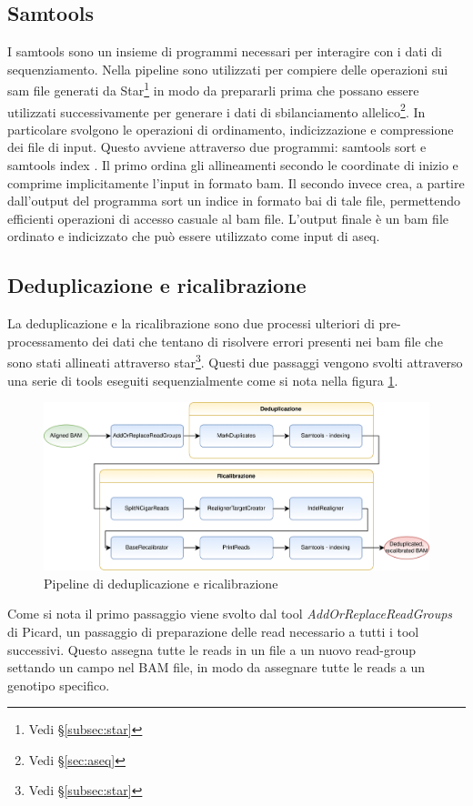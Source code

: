 	\subsection{Samtools}
	I samtools \cite{samtools} sono un insieme di programmi necessari per interagire con i dati di sequenziamento.
	Nella pipeline sono utilizzati per compiere delle operazioni sui sam file generati da Star\footnote{Vedi \S\ref{subsec:star}} in modo da prepararli prima che possano essere utilizzati successivamente per generare i dati di sbilanciamento allelico\footnote{Vedi \S\ref{sec:aseq}}.
  In particolare svolgono le operazioni di ordinamento, indicizzazione e compressione dei file di input.
  Questo avviene attraverso due programmi: samtools sort \cite{samtools-sort} e samtools index \cite{samtools-index}.
  Il primo ordina gli allineamenti secondo le coordinate di inizio e comprime implicitamente l'input in formato bam.
  Il secondo invece crea, a partire dall'output del programma sort un indice in formato bai di tale file, permettendo efficienti operazioni di accesso casuale al bam file.
  L'output finale \`e un bam file ordinato e indicizzato che pu\`o essere utilizzato come input di aseq.

	\subsection{Deduplicazione e ricalibrazione}
        \label{subsec:deduprecab}
	La deduplicazione e la ricalibrazione sono due processi ulteriori di pre-processamento dei dati che tentano di risolvere errori presenti nei bam file che sono stati allineati attraverso star\footnote{Vedi \S\ref{subsec:star}}.
  Questi due passaggi vengono svolti attraverso una serie di tools eseguiti sequenzialmente come si nota nella figura \ref{fig:pipeline_deduprecal}.
  \begin{figure}[H]
    \label{fig:pipeline_deduprecal}
    \centering
    \includegraphics[scale=0.17]{deduprecal.png}
    \caption{Pipeline di deduplicazione e ricalibrazione}
  \end{figure}
  Come si nota il primo passaggio viene svolto dal tool \emph{AddOrReplaceReadGroups} di Picard\cite{picard}, un passaggio di preparazione delle read necessario a tutti i tool successivi.
  Questo assegna tutte le reads in un file a un nuovo read-group settando un campo nel BAM file, in modo da assegnare tutte le reads a un genotipo specifico.


